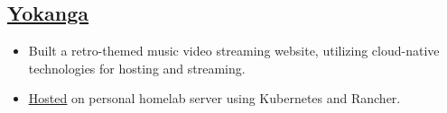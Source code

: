 \documentclass[a4paper,10pt]{article}
\begin{document}
\subsection*{\href{https://github.com/jordojordo/yokanga.xyz}{\underline{Yokanga}}}
\begin{itemize}[leftmargin=1.5em]
    \item Built a retro-themed music video streaming website, utilizing cloud-native technologies for hosting and streaming.
    \item \href{https://yokanga.xyz}{\underline{Hosted}} on personal homelab server using Kubernetes and Rancher.
\end{itemize}
\end{document}
